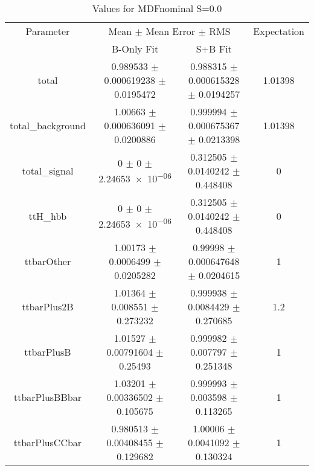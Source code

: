 \begin{table}
\centering
\caption{Values for MDFnominal S=0.0}
\begin{tabular}{cccc}
\toprule
Parameter & \multicolumn{2}{c}{Mean $\pm$ Mean Error $\pm$ RMS} & Expectation\\
 & B-Only Fit & S+B Fit & \\
\midrule
total & \num{0.989533} $\pm$ \num{0.000619238} $\pm$ \num{0.0195472} & \num{0.988315} $\pm$ \num{0.000615328} $\pm$ \num{0.0194257} & \num{1.01398}\\
total\_background & \num{1.00663} $\pm$ \num{0.000636091} $\pm$ \num{0.0200886} & \num{0.999994} $\pm$ \num{0.000675367} $\pm$ \num{0.0213398} & \num{1.01398}\\
total\_signal & \num{0} $\pm$ \num{0} $\pm$ \num{2.24653e-06} & \num{0.312505} $\pm$ \num{0.0140242} $\pm$ \num{0.448408} & \num{0}\\
ttH\_hbb & \num{0} $\pm$ \num{0} $\pm$ \num{2.24653e-06} & \num{0.312505} $\pm$ \num{0.0140242} $\pm$ \num{0.448408} & \num{0}\\
ttbarOther & \num{1.00173} $\pm$ \num{0.0006499} $\pm$ \num{0.0205282} & \num{0.99998} $\pm$ \num{0.000647648} $\pm$ \num{0.0204615} & \num{1}\\
ttbarPlus2B & \num{1.01364} $\pm$ \num{0.008551} $\pm$ \num{0.273232} & \num{0.999938} $\pm$ \num{0.0084429} $\pm$ \num{0.270685} & \num{1.2}\\
ttbarPlusB & \num{1.01527} $\pm$ \num{0.00791604} $\pm$ \num{0.25493} & \num{0.999982} $\pm$ \num{0.007797} $\pm$ \num{0.251348} & \num{1}\\
ttbarPlusBBbar & \num{1.03201} $\pm$ \num{0.00336502} $\pm$ \num{0.105675} & \num{0.999993} $\pm$ \num{0.003598} $\pm$ \num{0.113265} & \num{1}\\
ttbarPlusCCbar & \num{0.980513} $\pm$ \num{0.00408455} $\pm$ \num{0.129682} & \num{1.00006} $\pm$ \num{0.0041092} $\pm$ \num{0.130324} & \num{1}\\
\bottomrule
\end{tabular}
\end{table}